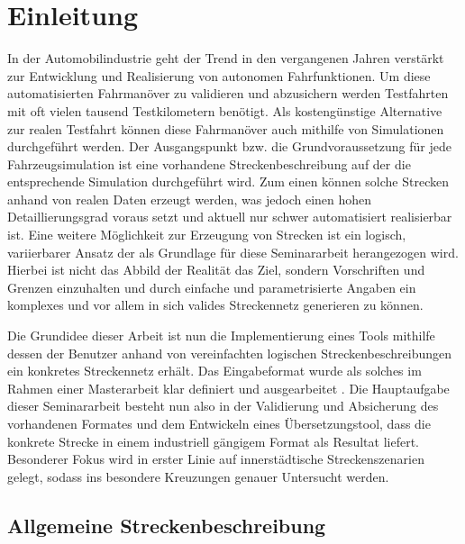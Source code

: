 \thispagestyle{ika}

\chapter{Einleitung}

In der Automobilindustrie geht der Trend in den vergangenen Jahren verstärkt  zur Entwicklung und Realisierung von autonomen Fahrfunktionen. Um diese automatisierten Fahrmanöver zu validieren und abzusichern werden Testfahrten mit oft vielen tausend Testkilometern benötigt. Als kostengünstige Alternative zur realen Testfahrt können diese Fahrmanöver auch mithilfe von Simulationen durchgeführt werden. Der Ausgangspunkt bzw. die Grundvoraussetzung für jede Fahrzeugsimulation ist eine vorhandene Streckenbeschreibung auf der die entsprechende Simulation durchgeführt wird. Zum einen können solche Strecken anhand von realen Daten erzeugt werden, was jedoch einen hohen Detaillierungsgrad voraus setzt und aktuell nur schwer automatisiert realisierbar ist. Eine weitere Möglichkeit zur Erzeugung von Strecken ist ein logisch, variierbarer Ansatz der als Grundlage für diese Seminararbeit herangezogen wird. Hierbei ist nicht das Abbild der Realität das Ziel, sondern Vorschriften und Grenzen einzuhalten und durch einfache und parametrisierte Angaben ein komplexes und vor allem in sich valides Streckennetz generieren zu können.

Die Grundidee dieser Arbeit ist nun die Implementierung eines Tools mithilfe dessen der Benutzer anhand von vereinfachten logischen Streckenbeschreibungen ein konkretes Streckennetz erhält. Das Eingabeformat wurde als solches im Rahmen einer Masterarbeit klar definiert und ausgearbeitet \cite{Russ.2019}. Die Hauptaufgabe dieser Seminararbeit besteht nun also in der Validierung und Absicherung des vorhandenen Formates und dem Entwickeln eines Übersetzungstool, dass die konkrete Strecke in einem industriell gängigem Format als Resultat liefert. Besonderer Fokus wird in erster Linie auf innerstädtische Streckenszenarien gelegt, sodass ins besondere Kreuzungen genauer Untersucht werden. 


\section{Allgemeine Streckenbeschreibung}

